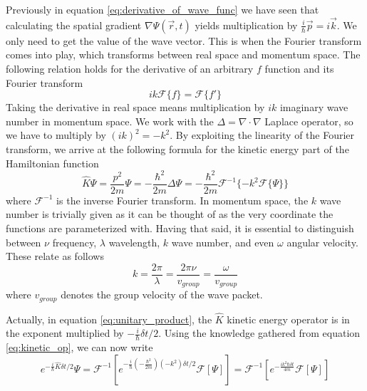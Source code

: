 Previously in equation \ref{eq:derivative_of_wave_func} we have seen that calculating the spatial gradient $\nabla \Psi(\vec{r}, t)$ yields multiplication by $\frac{i}{\hbar}\vec{p} = i\vec{k}$.
We only need to get the value of the wave vector.
This is when the Fourier transform comes into play, which transforms between real space and momentum space.
The following relation holds for the derivative of an arbitrary $f$ function and its Fourier transform
\begin{equation}
	ik\mathcal{F}\{f\} = \mathcal{F}\{f'\}
\end{equation}
Taking the derivative in real space means multiplication by $ik$ imaginary wave number in momentum space.
We work with the $\Delta = \nabla \cdot \nabla$ Laplace operator, so we have to multiply by $(ik)^2 = -k^2$.
By exploiting the linearity of the Fourier transform, we arrive at the following formula for the kinetic energy part of the Hamiltonian function
\begin{equation}
	\label{eq:kinetic_op}
	\hat{K} \Psi = \frac{p^2}{2m}\Psi = -\frac{\hbar^2}{2m} \Delta \Psi = -\frac{\hbar^2}{2m}\mathcal{F}^{-1}
	\{
	-k^2\mathcal{F}\{\Psi\}
	\}
\end{equation}
where $\mathcal{F}^{-1}$ is the inverse Fourier transform. In momentum space, the $k$ wave number is trivially given as it can be thought of as the very coordinate the functions are parameterized with.
Having that said, it is essential to distinguish between $\nu$ frequency, $\lambda$ wavelength, $k$ wave number, and even $\omega$ angular velocity.
These relate as follows
\begin{equation}
	\label{eq:relation_of_dimensions}
	k = \frac{2\pi}{\lambda} = \frac{2\pi\nu}{v_{group}} = \frac{\omega}{v_{group}}
\end{equation}
where $v_{group}$ denotes the group velocity of the wave packet.

Actually, in equation \ref{eq:unitary_product}, the $\hat{K}$ kinetic energy operator is in the exponent multiplied by $-\frac{i}{\hbar}\delta t / 2$.
Using the knowledge gathered from equation \ref{eq:kinetic_op}, we can now write
\begin{equation}
	\label{eq:kinetic_prop}
	e^{-\frac{i}{\hbar}\hat{K}\delta t / 2}\Psi = \mathcal{F}^{-1}
	\left[
	e^{-\frac{i}{\hbar} \left(-\frac{\hbar^2}{2m}\right) \left(-k^2\right) \delta t / 2} \mathcal{F}\left[ \Psi \right]
	\right] = 
	\mathcal{F}^{-1}
	\left[
	e^{-\frac{i k^2 \hbar \delta t}{4m}} \mathcal{F}\left[ \Psi \right]
	\right]
\end{equation}

